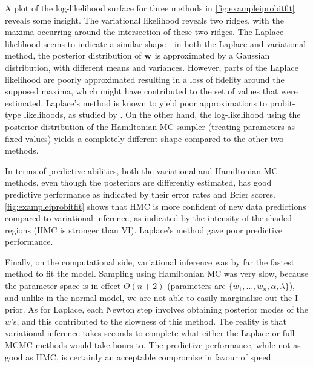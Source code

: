 A plot of the log-likelihood surface for three methods in \cref{fig:exampleiprobitfit} reveals some insight.
The variational likelihood reveals two ridges, with the maxima occurring around the intersection of these two ridges.
The Laplace likelihood seems to indicate a similar shape---in both the Laplace and variational method, the posterior distribution of ${\mathbf w}$ is approximated by a Gaussian distribution, with different means and variances.
However, parts of the Laplace likelihood are poorly approximated resulting in a loss of fidelity around the supposed maxima, which might have contributed to the set of values that were estimated.
Laplace's method is known to yield poor approximations to probit-type likelihoods, as studied by \citet{kuss2005assessing}.
On the other hand, the log-likelihood using the posterior distribution of the Hamiltonian MC sampler (treating parameters as fixed values) yields a completely different shape compared to the other two methods.

In terms of predictive abilities, both the variational and Hamiltonian MC methods, even though the posteriors are differently estimated, has good predictive performance as indicated by their error rates and Brier scores.
\cref{fig:exampleiprobitfit} shows that HMC is more confident of new data predictions compared to variational inference, as indicated by the intensity of the shaded regions (HMC is stronger than VI).
Laplace's method gave poor predictive performance.

Finally, on the computational side, variational inference was by far the fastest method to fit the model.
Sampling using Hamiltonian MC was very slow, because the parameter space is in effect $O(n + 2)$ (parameters are $\{w_1,\dots,w_n,\alpha,\lambda\}$), and unlike in the normal model, we are not able to easily marginalise out the I-prior.
As for Laplace, each Newton step involves obtaining posterior modes of the $w$'s, and this contributed to the slowness of this method.
The reality is that variational inference takes seconds to complete what either the Laplace or full MCMC methods would take hours to.
The predictive performance, while not as good as HMC, is certainly an acceptable compromise in favour of speed.

